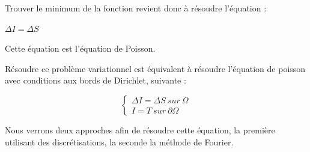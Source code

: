 Trouver le minimum de la fonction revient donc à résoudre l'équation : 
\begin{center}
$\Delta I = \Delta S$
\end{center}
Cette équation est l'équation de Poisson. 

Résoudre ce problème variationnel est équivalent à résoudre l'équation de poisson avec conditions aux bords de Dirichlet, suivante :
\begin{center}
    \begin{equation*}
        \left\{
        \begin{aligned}
         \Delta I = \Delta S  \ sur \  \Omega \\
          I = T \ sur \  \partial \Omega
        \end{aligned}
        \right.
    \end{equation*}
\end{center}

Nous verrons deux approches afin de résoudre cette équation, la première utilisant des discrétisations, la seconde la méthode de Fourier. 